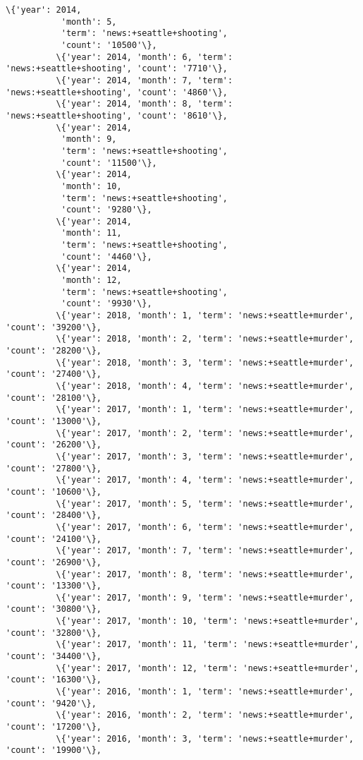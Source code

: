 \documentclass[11pt]{article}
\begin{document}
\begin{Verbatim}[commandchars=\\\{\}]
          \{'year': 2014,
           'month': 5,
           'term': 'news:+seattle+shooting',
           'count': '10500'\},
          \{'year': 2014, 'month': 6, 'term': 'news:+seattle+shooting', 'count': '7710'\},
          \{'year': 2014, 'month': 7, 'term': 'news:+seattle+shooting', 'count': '4860'\},
          \{'year': 2014, 'month': 8, 'term': 'news:+seattle+shooting', 'count': '8610'\},
          \{'year': 2014,
           'month': 9,
           'term': 'news:+seattle+shooting',
           'count': '11500'\},
          \{'year': 2014,
           'month': 10,
           'term': 'news:+seattle+shooting',
           'count': '9280'\},
          \{'year': 2014,
           'month': 11,
           'term': 'news:+seattle+shooting',
           'count': '4460'\},
          \{'year': 2014,
           'month': 12,
           'term': 'news:+seattle+shooting',
           'count': '9930'\},
          \{'year': 2018, 'month': 1, 'term': 'news:+seattle+murder', 'count': '39200'\},
          \{'year': 2018, 'month': 2, 'term': 'news:+seattle+murder', 'count': '28200'\},
          \{'year': 2018, 'month': 3, 'term': 'news:+seattle+murder', 'count': '27400'\},
          \{'year': 2018, 'month': 4, 'term': 'news:+seattle+murder', 'count': '28100'\},
          \{'year': 2017, 'month': 1, 'term': 'news:+seattle+murder', 'count': '13000'\},
          \{'year': 2017, 'month': 2, 'term': 'news:+seattle+murder', 'count': '26200'\},
          \{'year': 2017, 'month': 3, 'term': 'news:+seattle+murder', 'count': '27800'\},
          \{'year': 2017, 'month': 4, 'term': 'news:+seattle+murder', 'count': '10600'\},
          \{'year': 2017, 'month': 5, 'term': 'news:+seattle+murder', 'count': '28400'\},
          \{'year': 2017, 'month': 6, 'term': 'news:+seattle+murder', 'count': '24100'\},
          \{'year': 2017, 'month': 7, 'term': 'news:+seattle+murder', 'count': '26900'\},
          \{'year': 2017, 'month': 8, 'term': 'news:+seattle+murder', 'count': '13300'\},
          \{'year': 2017, 'month': 9, 'term': 'news:+seattle+murder', 'count': '30800'\},
          \{'year': 2017, 'month': 10, 'term': 'news:+seattle+murder', 'count': '32800'\},
          \{'year': 2017, 'month': 11, 'term': 'news:+seattle+murder', 'count': '34400'\},
          \{'year': 2017, 'month': 12, 'term': 'news:+seattle+murder', 'count': '16300'\},
          \{'year': 2016, 'month': 1, 'term': 'news:+seattle+murder', 'count': '9420'\},
          \{'year': 2016, 'month': 2, 'term': 'news:+seattle+murder', 'count': '17200'\},
          \{'year': 2016, 'month': 3, 'term': 'news:+seattle+murder', 'count': '19900'\},

\end{Verbatim}
\end{document}

